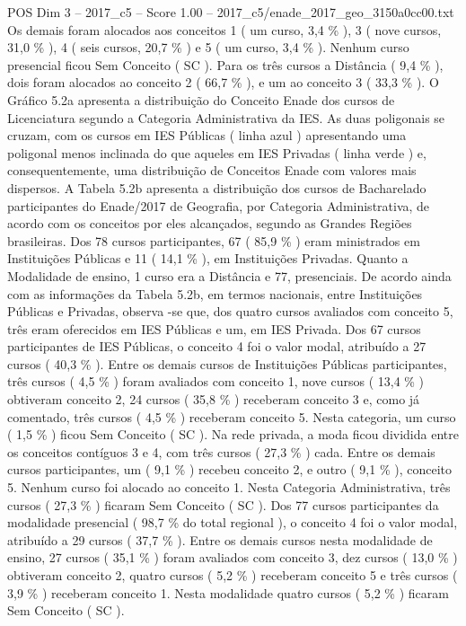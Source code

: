 \begin{textsample}{POS Dim 3 – 2017\_c5 – Score 1.00 – 2017\_c5/enade\_2017\_geo\_3150a0cc00.txt}
Os demais foram alocados aos conceitos 1 ( um curso, 3,4 \% ), 3 ( nove cursos, 31,0 \% ), 4 ( seis cursos, 20,7 \% ) e 5 ( um curso, 3,4 \% ).
Nenhum curso presencial ficou Sem Conceito ( SC ).
Para os três cursos a Distância ( 9,4 \% ), dois foram alocados ao conceito 2 ( 66,7 \% ), e um ao conceito 3 ( 33,3 \% ).
O Gráfico 5.2a apresenta a distribuição do Conceito Enade dos cursos de Licenciatura segundo a Categoria Administrativa da IES.
As duas poligonais se cruzam, com os cursos em IES Públicas ( linha azul ) apresentando uma poligonal menos inclinada do que aqueles em IES Privadas ( linha verde ) e, consequentemente, uma distribuição de Conceitos Enade com valores mais dispersos.
A Tabela 5.2b apresenta a distribuição dos cursos de Bacharelado participantes do Enade/2017 de Geografia, por Categoria Administrativa, de acordo com os conceitos por eles alcançados, segundo as Grandes Regiões brasileiras.
Dos 78 cursos participantes, 67 ( 85,9 \% ) eram ministrados em Instituições Públicas e 11 ( 14,1 \% ), em Instituições Privadas.
Quanto a Modalidade de ensino, 1 curso era a Distância e 77, presenciais.
De acordo ainda com as informações da Tabela 5.2b, em termos nacionais, entre Instituições Públicas e Privadas, observa -se que, dos quatro cursos avaliados com conceito 5, três eram oferecidos em IES Públicas e um, em IES Privada.
Dos 67 cursos participantes de IES Públicas, o conceito 4 foi o valor modal, atribuído a 27 cursos ( 40,3 \% ).
Entre os demais cursos de Instituições Públicas participantes, três cursos ( 4,5 \% ) foram avaliados com conceito 1, nove cursos ( 13,4 \% ) obtiveram conceito 2, 24 cursos ( 35,8 \% ) receberam conceito 3 e, como já comentado, três cursos ( 4,5 \% ) receberam conceito 5.
Nesta categoria, um curso ( 1,5 \% ) ficou Sem Conceito ( SC ).
Na rede privada, a moda ficou dividida entre os conceitos contíguos 3 e 4, com três cursos ( 27,3 \% ) cada.
Entre os demais cursos participantes, um ( 9,1 \% ) recebeu conceito 2, e outro ( 9,1 \% ), conceito 5.
Nenhum curso foi alocado ao conceito 1.
Nesta Categoria Administrativa, três cursos ( 27,3 \% ) ficaram Sem Conceito ( SC ).
Dos 77 cursos participantes da modalidade presencial ( 98,7 \% do total regional ), o conceito 4 foi o valor modal, atribuído a 29 cursos ( 37,7 \% ).
Entre os demais cursos nesta modalidade de ensino, 27 cursos ( 35,1 \% ) foram avaliados com conceito 3, dez cursos ( 13,0 \% ) obtiveram conceito 2, quatro cursos ( 5,2 \% ) receberam conceito 5 e três cursos ( 3,9 \% ) receberam conceito 1.
Nesta modalidade quatro cursos ( 5,2 \% ) ficaram Sem Conceito ( SC ).

\end{textsample}
